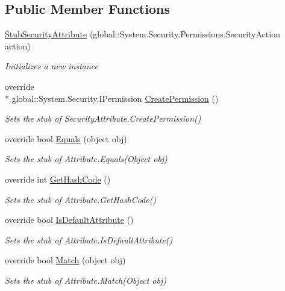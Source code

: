 \subsection*{Public Member Functions}
\begin{DoxyCompactItemize}
\item 
\hyperlink{class_system_1_1_security_1_1_permissions_1_1_fakes_1_1_stub_security_attribute_ad19f7432e40ff5bfe8a471f5cf0703f7}{Stub\-Security\-Attribute} (global\-::\-System.\-Security.\-Permissions.\-Security\-Action action)
\begin{DoxyCompactList}\small\item\em Initializes a new instance\end{DoxyCompactList}\item 
override \\*
global\-::\-System.\-Security.\-I\-Permission \hyperlink{class_system_1_1_security_1_1_permissions_1_1_fakes_1_1_stub_security_attribute_a818eeedcfdfc00db78dcfd954a975758}{Create\-Permission} ()
\begin{DoxyCompactList}\small\item\em Sets the stub of Security\-Attribute.\-Create\-Permission()\end{DoxyCompactList}\item 
override bool \hyperlink{class_system_1_1_security_1_1_permissions_1_1_fakes_1_1_stub_security_attribute_aaa7339c12d4c65e5b603c0feb79edf89}{Equals} (object obj)
\begin{DoxyCompactList}\small\item\em Sets the stub of Attribute.\-Equals(\-Object obj)\end{DoxyCompactList}\item 
override int \hyperlink{class_system_1_1_security_1_1_permissions_1_1_fakes_1_1_stub_security_attribute_a5d624cb2136101221cdca8c800d7ec70}{Get\-Hash\-Code} ()
\begin{DoxyCompactList}\small\item\em Sets the stub of Attribute.\-Get\-Hash\-Code()\end{DoxyCompactList}\item 
override bool \hyperlink{class_system_1_1_security_1_1_permissions_1_1_fakes_1_1_stub_security_attribute_addb5b0982f2aa6577ac37c63ad1605aa}{Is\-Default\-Attribute} ()
\begin{DoxyCompactList}\small\item\em Sets the stub of Attribute.\-Is\-Default\-Attribute()\end{DoxyCompactList}\item 
override bool \hyperlink{class_system_1_1_security_1_1_permissions_1_1_fakes_1_1_stub_security_attribute_aea0ab5c41f5d81a6dc44fd323521be9c}{Match} (object obj)
\begin{DoxyCompactList}\small\item\em Sets the stub of Attribute.\-Match(\-Object obj)\end{DoxyCompactList}\end{DoxyCompactItemize}
